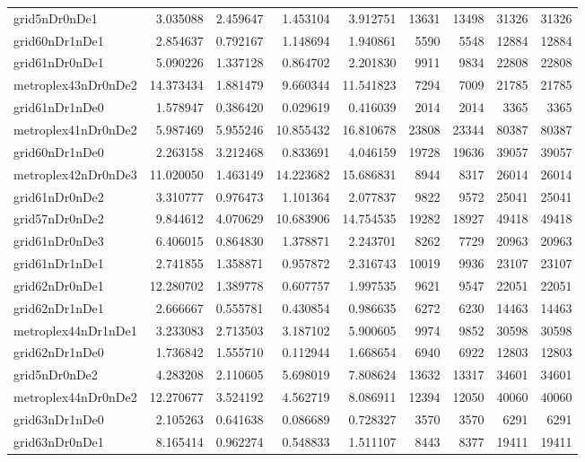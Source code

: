\begin{longtable}{|l|r|r|r|r|r|r|r|r|}
grid5nDr0nDe1 & 3.035088 & 2.459647 & 1.453104 & 3.912751 & 13631 & 13498 & 31326 & 31326 \\
grid60nDr1nDe1 & 2.854637 & 0.792167 & 1.148694 & 1.940861 & 5590 & 5548 & 12884 & 12884 \\
grid61nDr0nDe1 & 5.090226 & 1.337128 & 0.864702 & 2.201830 & 9911 & 9834 & 22808 & 22808 \\
metroplex43nDr0nDe2 & 14.373434 & 1.881479 & 9.660344 & 11.541823 & 7294 & 7009 & 21785 & 21785 \\
grid61nDr1nDe0 & 1.578947 & 0.386420 & 0.029619 & 0.416039 & 2014 & 2014 & 3365 & 3365 \\
metroplex41nDr0nDe2 & 5.987469 & 5.955246 & 10.855432 & 16.810678 & 23808 & 23344 & 80387 & 80387 \\
grid60nDr1nDe0 & 2.263158 & 3.212468 & 0.833691 & 4.046159 & 19728 & 19636 & 39057 & 39057 \\
metroplex42nDr0nDe3 & 11.020050 & 1.463149 & 14.223682 & 15.686831 & 8944 & 8317 & 26014 & 26014 \\
grid61nDr0nDe2 & 3.310777 & 0.976473 & 1.101364 & 2.077837 & 9822 & 9572 & 25041 & 25041 \\
grid57nDr0nDe2 & 9.844612 & 4.070629 & 10.683906 & 14.754535 & 19282 & 18927 & 49418 & 49418 \\
grid61nDr0nDe3 & 6.406015 & 0.864830 & 1.378871 & 2.243701 & 8262 & 7729 & 20963 & 20963 \\
grid61nDr1nDe1 & 2.741855 & 1.358871 & 0.957872 & 2.316743 & 10019 & 9936 & 23107 & 23107 \\
grid62nDr0nDe1 & 12.280702 & 1.389778 & 0.607757 & 1.997535 & 9621 & 9547 & 22051 & 22051 \\
grid62nDr1nDe1 & 2.666667 & 0.555781 & 0.430854 & 0.986635 & 6272 & 6230 & 14463 & 14463 \\
metroplex44nDr1nDe1 & 3.233083 & 2.713503 & 3.187102 & 5.900605 & 9974 & 9852 & 30598 & 30598 \\
grid62nDr1nDe0 & 1.736842 & 1.555710 & 0.112944 & 1.668654 & 6940 & 6922 & 12803 & 12803 \\
grid5nDr0nDe2 & 4.283208 & 2.110605 & 5.698019 & 7.808624 & 13632 & 13317 & 34601 & 34601 \\
metroplex44nDr0nDe2 & 12.270677 & 3.524192 & 4.562719 & 8.086911 & 12394 & 12050 & 40060 & 40060 \\
grid63nDr1nDe0 & 2.105263 & 0.641638 & 0.086689 & 0.728327 & 3570 & 3570 & 6291 & 6291 \\
grid63nDr0nDe1 & 8.165414 & 0.962274 & 0.548833 & 1.511107 & 8443 & 8377 & 19411 & 19411 \\

\end{longtable}

